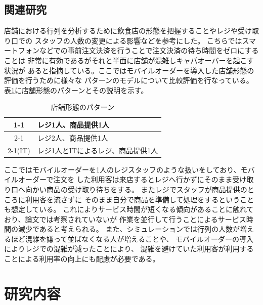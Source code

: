 \documentclass{jsarticle}
\begin{document}
\newpage

\subsection{関連研究}

店舗における行列を分析するために飲食店の形態を把握することやレジや受け取り口での
スタッフの人数の変更による影響などを参考にした。
こちらではスマートフォンなどでの事前注文決済を行うことで注文決済の待ち時間をゼロにすることは
非常に有効であるがそれと半面に店舗が混雑しキャパオーバーを起こす状況\cite{bibi2}が
あると指摘している。ここではモバイルオーダーを導入した店舗形態の評価を行うために様々な
パターンのモデルについて比較評価を行なっている。表\ref{table1}に店舗形態のパターンとその説明を示す。

\begin{table}[H]
 \begin{center}
   \caption{店舗形態のパターン}
  \begin{tabular}{|c|l|} \hline
1-1     & レジ1人、商品提供1人\\ \hline
2-1     & レジ2人、商品提供1人\\ \hline
2-1(IT) & レジ1人とITによるレジ、商品提供1人\\ \hline
  \end{tabular}
 \label{table1}
 \end{center}
\end{table}

ここではモバイルオーダーを1人のレジスタッフのような扱いをしており、モバイルオーダーで注文を
した利用客は来店するとレジへ行かずにそのまま受け取り口へ向かい商品の受け取り待ちをする。
またレジでスタッフが商品提供のところに利用客を流さずに
そのまま自分で商品を準備して処理をするということも想定している。
これによりサービス時間が短くなる傾向があることに触れており、論文では考察されていないが
作業を並行して行うことによるサービス時間の減少であると考えられる。
また、シミュレーションでは行列の人数が増えるほど混雑を嫌って並ばなくなる人が増えることや、
モバイルオーダーの導入によりレジでの混雑が減ったことにより、
混雑を避けていた利用客が利用することによる利用率の向上にも配慮が必要である。





\newpage

\section{研究内容}
\end{document}
